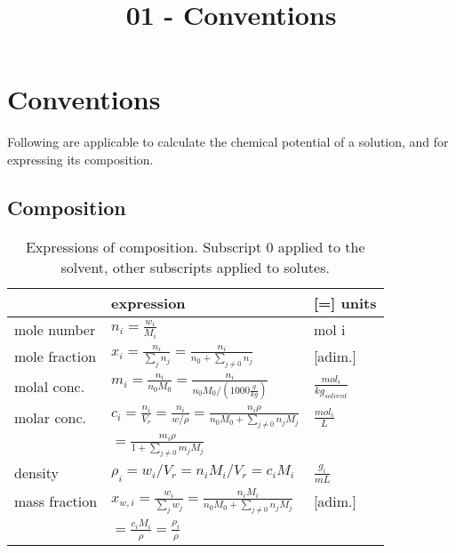 \documentclass[onecolumn]{article}
\begin{document}
\title{01 - Conventions}
\author{}
\date{}
\maketitle
\section{Conventions} %
Following are applicable to calculate the chemical potential of a solution, and for expressing its composition.
\label{sec:conventions}
\subsection{Composition}
\label{subsec:composition}
\begin{table}[h]
\begin{tabular}{|lll|}
\hline
		      & expression                                                                                    & [=] units                     \\
\hline
mole number   & $n_i = \frac{w_i}{M_i}$                                                                                   & mol i                         \\
mole fraction & $x_i = \frac{n_i}{\sum_j{n_j}} =  \frac{n_i}{n_0 + \sum_{j \neq 0}{n_j}}$                         & [adim.]                       \\
molal  conc.  & $m_i = \frac{n_i}{n_0 M_0} = \frac{n_i}{n_0 M_0 / \left(1000 \frac{g}{kg} \right)}$               & $\frac{mol_i} {kg_{solvent}}$ \\
molar  conc.  & $c_i = \frac{n_i}{V_r} = \frac{n_i}{w/\rho} = \frac{n_i \rho}{n_0 M_0 + \sum_{j\neq 0}{n_j M_j}}$ & $\frac{mol_i}{L}$\\
              & $= \frac{m_i \rho}{1 + \sum_{j\neq 0}{m_j M_j}}$     &       \\
density 	  & $\rho_i = w_i/V_r = n_i M_i/V_r = c_i M_i$			 &	$\frac{g_i}{mL}$ \\
mass fraction & $x_{w,i} = \frac{w_i}{\sum_j{w_j}} =  \frac{n_i M_i}{n_0 M_0 + \sum_{j \neq 0}{n_j M_j}}$                         & [adim.]                       \\
			  & $= \frac{c_i M_i}{\rho} = \frac{\rho_i}{\rho}$  &  \\
\hline
\end{tabular}
\caption{Expressions of composition. Subscript 0 applied to the solvent, other subscripts applied to solutes.}
\label{table:composition_expr}
\end{table}
\end{document}
